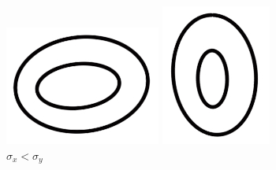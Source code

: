 \begin{figure}[h]
\centering
\begin{minipage}{.45\linewidth}
  \includegraphics[width=\linewidth]{images/L11/wider.jpeg}
  \caption{$\sigma_x > \sigma_y$}
  \label{wider}
\end{minipage}
\hspace{.05\linewidth}
\begin{minipage}{.45\linewidth}
  \includegraphics[width=\linewidth]{images/L11/taller.jpeg}
  \caption{$\sigma_x < \sigma_y$}
  \label{taller}
\end{minipage}
\end{figure}

